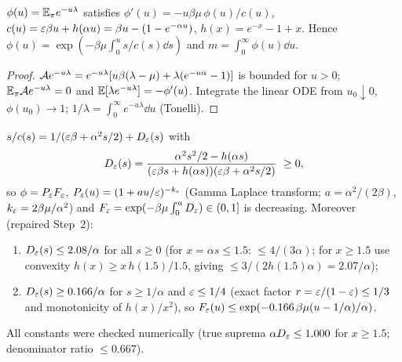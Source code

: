 \begin{lemma}\label{lem:laplace}\Pt{}
$\phi(u)=\mathbb{E}_\pi e^{-u\lambda}$ satisfies $\phi'(u)=-u\beta\mu\,\phi(u)/c(u)$, $c(u)=\varepsilon\beta u+h(\alpha u)=\beta u-(1-e^{-\alpha u})$, $h(x)=e^{-x}-1+x$. Hence
$\phi(u)=\exp(-\beta\mu\int_0^us/c(s)\dd s)$ and $m=\int_0^\infty\phi(u)\dd u$.
\end{lemma}
\begin{proof}
$\mathcal A e^{-u\lambda}=e^{-u\lambda}[u\beta(\lambda-\mu)+\lambda(e^{-u\alpha}-1)]$ is bounded for $u>0$; $\mathbb{E}_\pi\mathcal A e^{-u\lambda}=0$ and $\mathbb{E}[\lambda e^{-u\lambda}]=-\phi'(u)$. Integrate the linear ODE from $u_0\downarrow0$, $\phi(u_0)\to1$; $1/\lambda=\int_0^\infty e^{-u\lambda}\dd u$ (Tonelli).
\end{proof}

\begin{lemma}\label{lem:gammafact}\Pt{}
$s/c(s)=1/(\varepsilon\beta+\alpha^2s/2)+D_\varepsilon(s)$ with
\[
D_\varepsilon(s)=\frac{\alpha^2s^2/2-h(\alpha s)}{(\varepsilon\beta s+h(\alpha s))(\varepsilon\beta+\alpha^2s/2)}\ \ge0,
\]
so $\phi=P_\varepsilon F_\varepsilon$, $P_\varepsilon(u)=(1+au/\varepsilon)^{-k_\varepsilon}$ (Gamma Laplace transform; $a=\alpha^2/(2\beta)$, $k_\varepsilon=2\beta\mu/\alpha^2$) and $F_\varepsilon=\exp(-\beta\mu\int_0^uD_\varepsilon)\in(0,1]$ is decreasing. Moreover (repaired Step~2):
\begin{enumerate}[label=(\roman*),nosep]
\item $D_\varepsilon(s)\le 2.08/\alpha$ for all $s\ge0$ (for $x=\alpha s\le1.5$: $\le4/(3\alpha)$; for $x\ge1.5$ use convexity $h(x)\ge x\,h(1.5)/1.5$, giving $\le3/(2h(1.5)\alpha)=2.07/\alpha$);
\item $D_\varepsilon(s)\ge0.166/\alpha$ for $s\ge1/\alpha$ and $\varepsilon\le1/4$ (exact factor $r=\varepsilon/(1-\varepsilon)\le1/3$ and monotonicity of $h(x)/x^2$), so $F_\varepsilon(u)\le\exp(-0.166\,\beta\mu(u-1/\alpha)/\alpha)$.
\end{enumerate}
All constants were checked numerically (true suprema $\alpha D_\varepsilon\le1.000$ for $x\ge1.5$; denominator ratio $\le0.667$).
\end{lemma}

